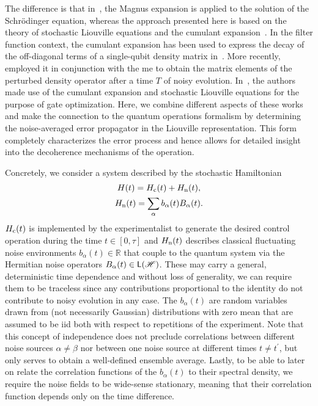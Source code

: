 The difference is that in~, the Magnus expansion is applied to the solution of the Schrödinger equation, whereas the approach presented here is based on the theory of stochastic Liouville equations and the cumulant expansion~\cite{Kubo1962,Kubo1963}.
In the filter function context, the cumulant expansion has been used to express the decay of the off-diagonal terms of a single-qubit density matrix in~.
More recently,~\citet{Paz-Silva2014} employed it in conjunction with the \gls{me} to obtain the matrix elements of the perturbed density operator after a time $T$ of noisy evolution.
In~, the authors made use of the cumulant expansion and stochastic Liouville equations for the purpose of gate optimization.
Here, we combine different aspects of these works and make the connection to the quantum operations formalism by determining the noise-averaged error propagator in the Liouville representation.
This form completely characterizes the error process and hence allows for detailed insight into the decoherence mechanisms of the operation.

Concretely, we consider a system described by the stochastic Hamiltonian
\begin{gather}
    H(t) = H_{\mathrm{c}}(t) + H_{\mathrm{n}}(t),\label{eq:ff:hamiltonian} \\
    H_{\mathrm{n}}(t) = \sum_\alpha b_\alpha(t) B_\alpha(t). \label{eq:ff:hamiltonian:noise}
\end{gather}
$H_{\mathrm{c}}(t)$ is implemented by the experimentalist to generate the desired control operation during the time $t\in [0, \tau]$ and $H_{\mathrm{n}}(t)$ describes classical fluctuating noise environments $b_\alpha(t)\in\mathbb{R}$ that couple to the quantum system via the Hermitian noise operators $B_\alpha(t)\in\mathsf{L}(\mathscr{H})$.
These may carry a general, deterministic time dependence and without loss of generality, we can require them to be traceless since any contributions proportional to the identity do not contribute to noisy evolution in any case.
The $b_\alpha(t)$ are random variables drawn from (not necessarily Gaussian) distributions with zero mean that are assumed to be \gls{iid} both with respect to repetitions of the experiment.
Note that this concept of independence does not preclude correlations between different noise sources $\alpha\neq\beta$ nor between one noise source at different times $t\neq t^\prime$, but only serves to obtain a well-defined ensemble average.
Lastly, to be able to later on relate the correlation functions of the $b_\alpha(t)$ to their spectral density, we require the noise fields to be wide-sense stationary, meaning that their correlation function depends only on the time difference.

